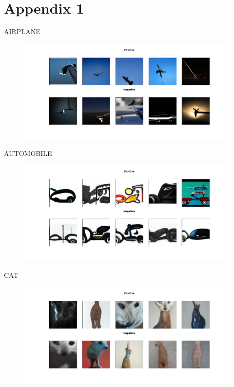 \documentclass[12pt,a4paper,openany]{book}
\begin{document}
\chapter{Appendix 1}
\noindent AIRPLANE
\begin{figure}[h!]
    \centering
    \includegraphics[scale=0.4]{figs/cifar10_examples/airplane.png}
\end{figure}
\newline
AUTOMOBILE
\begin{figure}[h!]
    \centering
    \includegraphics[scale=0.4]{figs/cifar10_examples/automobile.png}
\end{figure}
\newpage
\noindent CAT
\begin{figure}[h!]
    \centering
    \includegraphics[scale=0.4]{figs/cifar10_examples/cat.png}
\end{figure}
\end{document}

